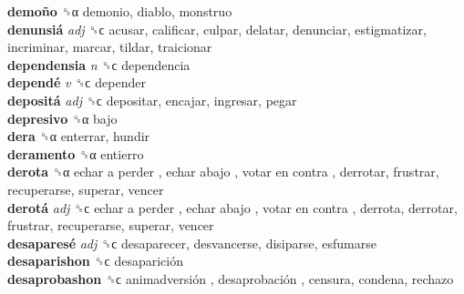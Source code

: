 \textbf{demoño} ␝α  demonio, diablo, monstruo  \\
\textbf{denunsiá} \emph{adj}  ␝ϲ  acusar, calificar, culpar, delatar, denunciar, estigmatizar, incriminar, marcar, tildar, traicionar  \\
\textbf{dependensia} \emph{n}  ␝ϲ  dependencia  \\
\textbf{dependé} \emph{v}  ␝ϲ  depender  \\
\textbf{depositá} \emph{adj}  ␝ϲ  depositar, encajar, ingresar, pegar  \\
\textbf{depresivo} ␝α  bajo  \\
\textbf{dera} ␝α  enterrar, hundir  \\
\textbf{deramento} ␝α  entierro  \\
\textbf{derota} ␝α   echar a perder ,  echar abajo ,  votar en contra , derrotar, frustrar, recuperarse, superar, vencer  \\
\textbf{derotá} \emph{adj}  ␝ϲ   echar a perder ,  echar abajo ,  votar en contra , derrota, derrotar, frustrar, recuperarse, superar, vencer  \\
\textbf{desaparesé} \emph{adj}  ␝ϲ  desaparecer, desvancerse, disiparse, esfumarse  \\
\textbf{desaparishon} ␝ϲ   desaparición   \\
\textbf{desaprobashon} ␝ϲ   animadversión ,  desaprobación , censura, condena, rechazo  \\
